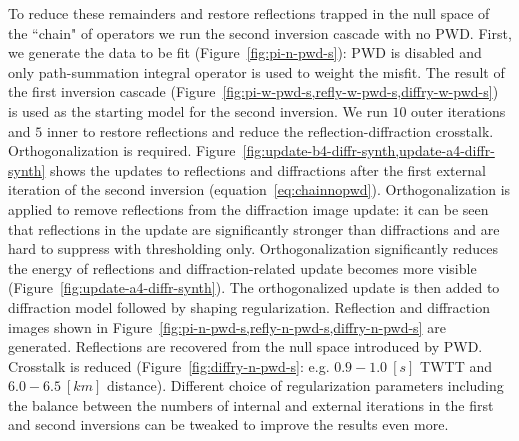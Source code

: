 To reduce these remainders and restore reflections trapped in the null space of the ``chain" of operators we run the second inversion
cascade with no PWD. First, we generate the data to be fit (Figure~\ref{fig:pi-n-pwd-s}): PWD is disabled and
only path-summation integral operator is used to weight the misfit. The result of the first inversion cascade (Figure~\ref{fig:pi-w-pwd-s,refly-w-pwd-s,diffry-w-pwd-s})
is used as the starting model for the second inversion. We run $10$ outer iterations and $5$ inner to restore reflections and reduce the reflection-diffraction crosstalk. Orthogonalization
is required. Figure~\ref{fig:update-b4-diffr-synth,update-a4-diffr-synth} shows the updates to reflections and diffractions after the first external iteration
of the second inversion (equation~\ref{eq:chainnopwd}). Orthogonalization is applied to remove reflections from the diffraction image update: it can be seen that reflections
in the update are significantly stronger than diffractions and are hard to suppress with thresholding only. Orthogonalization significantly reduces the energy of reflections
and diffraction-related update becomes more visible (Figure~\ref{fig:update-a4-diffr-synth}). The orthogonalized update is then added to diffraction model followed by shaping regularization.
Reflection and diffraction images shown in Figure~\ref{fig:pi-n-pwd-s,refly-n-pwd-s,diffry-n-pwd-s} are generated.
Reflections are recovered from the null space introduced by PWD. Crosstalk is reduced (Figure~\ref{fig:diffry-n-pwd-s}: e.g. $0.9-1.0\ [s]$ TWTT and $6.0-6.5\ [km]$ distance).
Different choice of regularization parameters including the balance between the numbers of internal and external iterations in the first and
second inversions can be tweaked to improve the results even more.   




